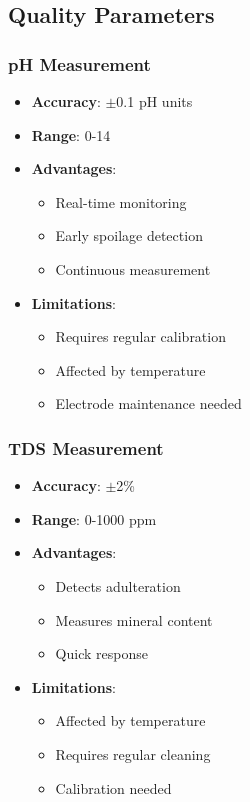 \documentclass[12pt,a4paper]{article}
\begin{document}
\subsection{Quality Parameters}

\subsubsection{pH Measurement}
\begin{itemize}
    \item \textbf{Accuracy}: $\pm$0.1 pH units
    \item \textbf{Range}: 0-14
    \item \textbf{Advantages}:
    \begin{itemize}
        \item Real-time monitoring
        \item Early spoilage detection
        \item Continuous measurement
    \end{itemize}
    \item \textbf{Limitations}:
    \begin{itemize}
        \item Requires regular calibration
        \item Affected by temperature
        \item Electrode maintenance needed
    \end{itemize}
\end{itemize}

\subsubsection{TDS Measurement}
\begin{itemize}
    \item \textbf{Accuracy}: $\pm$2\%
    \item \textbf{Range}: 0-1000 ppm
    \item \textbf{Advantages}:
    \begin{itemize}
        \item Detects adulteration
        \item Measures mineral content
        \item Quick response
    \end{itemize}
    \item \textbf{Limitations}:
    \begin{itemize}
        \item Affected by temperature
        \item Requires regular cleaning
        \item Calibration needed
    \end{itemize}
\end{itemize}
\end{document}
